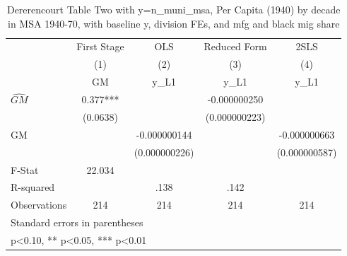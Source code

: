 \begin{table}[htbp]\centering
\def\sym#1{\ifmmode^{#1}\else\(^{#1}\)\fi}
\caption{Dererencourt Table Two with y=n\_muni\_msa, Per Capita (1940) by decade in MSA 1940-70, with baseline y, division FEs, and mfg and black mig share}
\begin{tabular}{l*{4}{c}}
\toprule
                    & First Stage   &         OLS   &Reduced Form   &        2SLS   \\
                    &\multicolumn{1}{c}{(1)}&\multicolumn{1}{c}{(2)}&\multicolumn{1}{c}{(3)}&\multicolumn{1}{c}{(4)}\\
                    &\multicolumn{1}{c}{GM}&\multicolumn{1}{c}{y\_L1}&\multicolumn{1}{c}{y\_L1}&\multicolumn{1}{c}{y\_L1}\\
\midrule
$\hat{GM}$          &       0.377***&               &-0.000000250   &               \\
                    &    (0.0638)   &               &(0.000000223)   &               \\
\addlinespace
GM                  &               &-0.000000144   &               &-0.000000663   \\
                    &               &(0.000000226)   &               &(0.000000587)   \\
\midrule
F-Stat              &      22.034   &               &               &               \\
R-squared           &               &        .138   &        .142   &               \\
Observations        &         214   &         214   &         214   &         214   \\
\bottomrule
\multicolumn{5}{l}{\footnotesize Standard errors in parentheses}\\
\multicolumn{5}{l}{\footnotesize * p<0.10, ** p<0.05, *** p<0.01}\\
\end{tabular}
\end{table}
